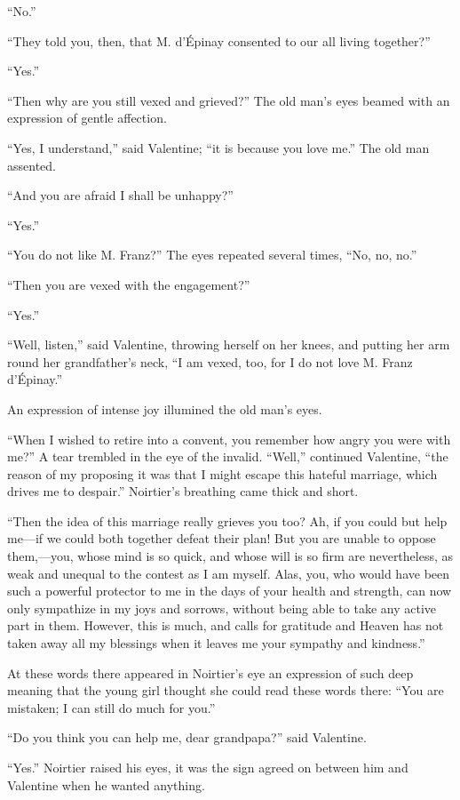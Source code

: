 “No.”

“They told you, then, that M. d’Épinay consented to our all living
together?”

“Yes.”

“Then why are you still vexed and grieved?” The old man’s eyes beamed
with an expression of gentle affection.

“Yes, I understand,” said Valentine; “it is because you love me.” The
old man assented.

“And you are afraid I shall be unhappy?”

“Yes.”

“You do not like M. Franz?” The eyes repeated several times, “No, no,
no.”

“Then you are vexed with the engagement?”

“Yes.”

“Well, listen,” said Valentine, throwing herself on her knees, and
putting her arm round her grandfather’s neck, “I am vexed, too, for I
do not love M. Franz d’Épinay.”

An expression of intense joy illumined the old man’s eyes.

“When I wished to retire into a convent, you remember how angry you
were with me?” A tear trembled in the eye of the invalid. “Well,”
continued Valentine, “the reason of my proposing it was that I might
escape this hateful marriage, which drives me to despair.” Noirtier’s
breathing came thick and short.

“Then the idea of this marriage really grieves you too? Ah, if you
could but help me—if we could both together defeat their plan! But you
are unable to oppose them,—you, whose mind is so quick, and whose will
is so firm are nevertheless, as weak and unequal to the contest as I am
myself. Alas, you, who would have been such a powerful protector to me
in the days of your health and strength, can now only sympathize in my
joys and sorrows, without being able to take any active part in them.
However, this is much, and calls for gratitude and Heaven has not taken
away all my blessings when it leaves me your sympathy and kindness.”

At these words there appeared in Noirtier’s eye an expression of such
deep meaning that the young girl thought she could read these words
there: “You are mistaken; I can still do much for you.”

“Do you think you can help me, dear grandpapa?” said Valentine.

“Yes.” Noirtier raised his eyes, it was the sign agreed on between him
and Valentine when he wanted anything.


